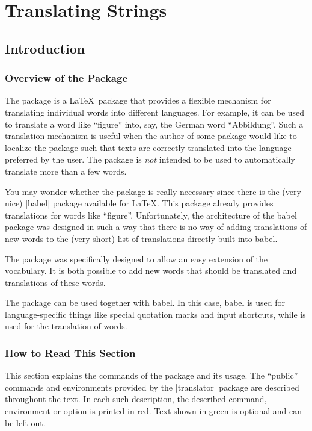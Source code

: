 \documentclass{ltxdoc}
\begin{document}
\section{Translating Strings}

\subsection{Introduction}

\subsubsection{Overview of the Package}

The  package is a \LaTeX\ package that provides a flexible
mechanism for translating individual words into different languages. For
example, it can be used to translate a word like ``figure'' into, say, the
German word ``Abbildung''. Such a translation mechanism is useful when the
author of some package would like to localize the package such that texts are
correctly translated into the language preferred by the user. The
 package is \emph{not} intended to be used to automatically
translate more than a few words.

You may wonder whether the  package is really necessary since
there is the (very nice) |babel| package available for \LaTeX. This package
already provides translations for words like ``figure''. Unfortunately, the
architecture of the babel package was designed in such a way that there is no
way of adding translations of new words to the (very short) list of
translations directly built into babel.

The  package was specifically designed to allow an easy
extension of the vocabulary. It is both possible to add new words that should
be translated and translations of these words.

The  package can be used together with babel. In this case,
babel is used for language-specific things like special quotation marks and
input shortcuts, while  is used for the translation of words.

\subsubsection{How to Read This Section}

This section explains the commands of the  package and its
usage. The ``public'' commands and environments provided by the |translator|
package are described throughout the text. In each such description, the
described command, environment or option is printed in red. Text shown in green
is optional and can be left out.
\end{document}
